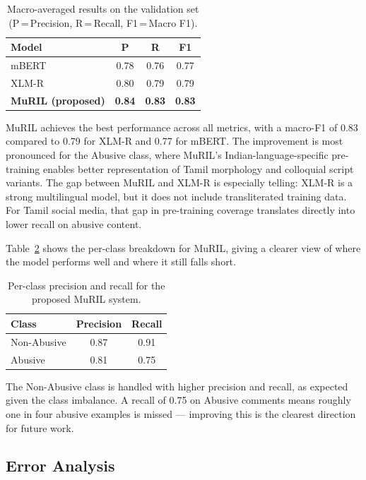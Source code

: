 \documentclass[11pt]{article}
\begin{document}
\begin{table}[h]
\centering
\begin{tabular}{lccc}
\toprule
\textbf{Model} & \textbf{P} & \textbf{R} & \textbf{F1} \\
\midrule
mBERT & 0.78 & 0.76 & 0.77 \\
XLM-R & 0.80 & 0.79 & 0.79 \\
\textbf{MuRIL (proposed)} & \textbf{0.84} & \textbf{0.83} & \textbf{0.83} \\
\bottomrule
\end{tabular}
\caption{Macro-averaged results on the validation set (P\,=\,Precision, R\,=\,Recall, F1\,=\,Macro F1).}
\label{tab:results}
\end{table}

MuRIL achieves the best performance across all
metrics, with a macro-F1 of 0.83 compared to 0.79
for XLM-R and 0.77 for mBERT. The improvement
is most pronounced for the Abusive class, where
MuRIL's Indian-language-specific pre-training enables better representation of Tamil morphology
and colloquial script variants. The gap between
MuRIL and XLM-R is especially telling: XLM-R
is a strong multilingual model, but it does not include transliterated training data. For Tamil social
media, that gap in pre-training coverage translates
directly into lower recall on abusive content.

Table~\ref{tab:perclass} shows the per-class breakdown for
MuRIL, giving a clearer view of where the model
performs well and where it still falls short.

\begin{table}[h]
\centering
\begin{tabular}{lcc}
\toprule
\textbf{Class} & \textbf{Precision} & \textbf{Recall} \\
\midrule
Non-Abusive & 0.87 & 0.91 \\
Abusive     & 0.81 & 0.75 \\
\bottomrule
\end{tabular}
\caption{Per-class precision and recall for the proposed MuRIL system.}
\label{tab:perclass}
\end{table}

The Non-Abusive class is handled with higher
precision and recall, as expected given the class
imbalance. A recall of 0.75 on Abusive comments
means roughly one in four abusive examples is
missed --- improving this is the clearest direction
for future work.

\subsection{Error Analysis}
\end{document}
